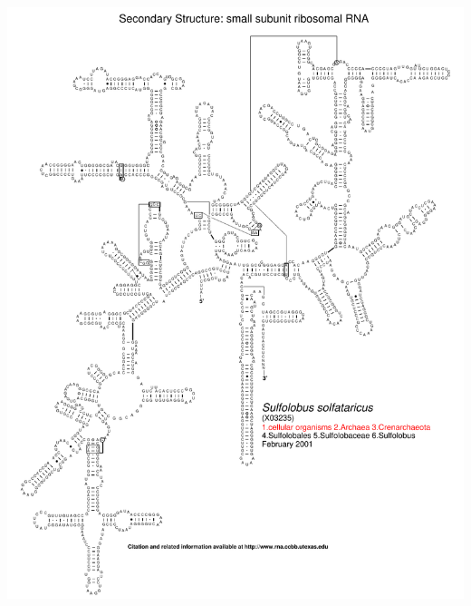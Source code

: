 \documentclass[landscape]{slides}
\begin{document}
\begin{slide}\begin{center}\includegraphics[height=8in]{figs/arc-22}\end{center}\vfill\end{slide}
\end{document}
